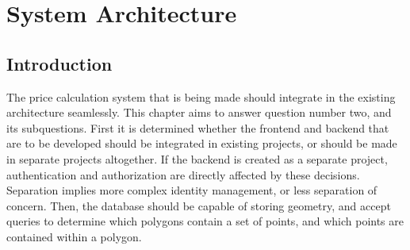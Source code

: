 \graphicspath{{Chapter3/Figs/Vector/}{Chapter3/Figs/}}

%
\chapter{System Architecture}
\section{Introduction}
The price calculation system that is being made should integrate in the existing architecture seamlessly. This chapter aims to answer question number two, and its subquestions. First it is determined whether the frontend and backend that are to be developed should be integrated in existing projects, or should be made in separate projects altogether. If the backend is created as a separate project, authentication and authorization are directly affected by these decisions. Separation implies more complex identity management, or less separation of concern. Then, the database should be capable of storing geometry, and accept queries to determine which polygons contain a set of points, and which points are contained within a polygon.

%
